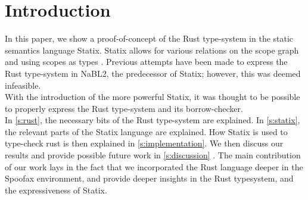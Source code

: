 \section{Introduction}
In this paper, we show a proof-of-concept of the Rust type-system in the static semantics language Statix. Statix allows for various relations on the scope graph and using scopes as types \citep{antwerpen}. Previous attempts have been made to express the Rust type-system in NaBL2, the predecessor of Statix; however, this was deemed infeasible. \\
With the introduction of the more powerful Statix, it was thought to be possible to properly express the Rust type-system and its borrow-checker.\\
In \autoref{s:rust}, the necessary bits of the Rust type-system are explained. In \autoref{s:statix}, the relevant parts of the Statix language are explained. How Statix is used to type-check rust is then explained in \autoref{s:implementation}. We then discuss our results and provide possible future work in \autoref{s:discussion} .
The main contribution of our work lays in the fact that we incorporated the Rust language deeper in the Spoofax environment, and provide deeper insights in the Rust typesystem, and the expressiveness of Statix.












